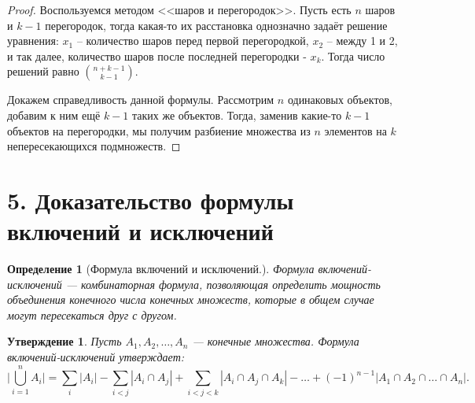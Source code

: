 \documentclass[a4paper,12pt]{article}
\newtheorem*{defin}{Определение}
\newtheorem*{state}{Утверждение}
\begin{document}
    \begin{proof}
        \par Воспользуемся методом <<шаров и перегородок>>. Пусть есть $n$ шаров и
        $k-1$ перегородок, тогда какая-то их расстановка однозначно задаёт
        решение уравнения: $x_1$ --  количество шаров перед первой
        перегородкой, $x_2$ -- между 1 и 2, и так далее, количество шаров после
        последней перегородки - $x_k$. Тогда число решений равно ${n+k-1
        \choose k-1}$.
        \par Докажем справедливость данной формулы. Рассмотрим $n$ одинаковых
        объектов, добавим к ним ещё $k-1$ таких же объектов. Тогда, заменив
        какие-то $k-1$ объектов на перегородки, мы получим разбиение множества
        из $n$ элементов на $k$ непересекающихся подмножеств.
    \end{proof}



 	\section*{5. Доказательство формулы включений и исключений}
 	\begin{defin} [Формула включений и исключений.] Формула включений-исключений — комбинаторная формула, позволяющая определить мощность объединения конечного числа конечных множеств, которые в общем случае могут пересекаться друг с другом.
 	\end{defin}
 	\begin{state}
		Пусть $ A_{1}, A_{2},\ldots , A_{n} $ — конечные множества. Формула включений-исключений утверждает:
		$$\biggl | \bigcup_{i=1}^{n}A_i \biggl | =
		 \sum_{i} | A_i | - \sum_{i<j} | A_i \cap A_j | + \sum_{i<j<k} | A_i \cap A_j \cap A_k | - \ldots + (-1)^{n-1} | A_1 \cap A_2 \cap \ldots \cap A_n |.$$
 	\end{state}
\end{document}
